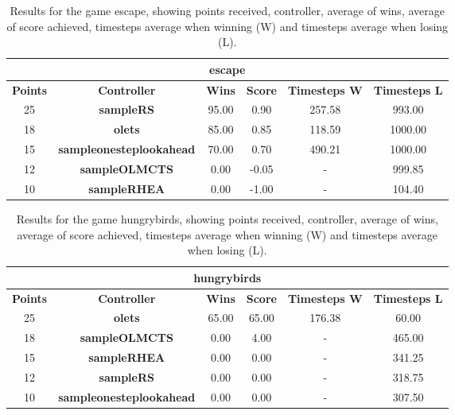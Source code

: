 \begin{table*}[!t]
\begin{center}
\begin{tabular}{|c|c|c|c|c|c|}
\multicolumn{6}{c}{\textbf{escape}}\\
\hline
\textbf{Points} & \textbf{Controller} & \textbf{Wins} &  \textbf{Score} & \textbf{Timesteps W} & \textbf{Timesteps L}\\
\hline
25 & \textbf{sampleRS} & 95.00 & 0.90 & 257.58 & 993.00
 \\
\hline
18 & \textbf{olets} & 85.00 & 0.85 & 118.59 & 1000.00
 \\
\hline
15 & \textbf{sampleonesteplookahead} & 70.00 & 0.70 & 490.21 & 1000.00
 \\
\hline
12 & \textbf{sampleOLMCTS} & 0.00 & -0.05 &  -  & 999.85
 \\
\hline
10 & \textbf{sampleRHEA} & 0.00 & -1.00 &  -  & 104.40
 \\
\hline
\end{tabular}
\caption{Results for the game escape, showing points received, controller, average of wins, average of score achieved, timesteps average when winning (W) and timesteps average when losing (L).}
\label{tab:weights}
\end{center}
\end{table*}
\begin{table*}[!t]
\begin{center}
\begin{tabular}{|c|c|c|c|c|c|}
\multicolumn{6}{c}{\textbf{hungrybirds}}\\
\hline
\textbf{Points} & \textbf{Controller} & \textbf{Wins} &  \textbf{Score} & \textbf{Timesteps W} & \textbf{Timesteps L}\\
\hline
25 & \textbf{olets} & 65.00 & 65.00 & 176.38 & 60.00
 \\
\hline
18 & \textbf{sampleOLMCTS} & 0.00 & 4.00 &  -  & 465.00
 \\
\hline
15 & \textbf{sampleRHEA} & 0.00 & 0.00 &  -  & 341.25
 \\
\hline
12 & \textbf{sampleRS} & 0.00 & 0.00 &  -  & 318.75
 \\
\hline
10 & \textbf{sampleonesteplookahead} & 0.00 & 0.00 &  -  & 307.50
 \\
\hline
\end{tabular}
\caption{Results for the game hungrybirds, showing points received, controller, average of wins, average of score achieved, timesteps average when winning (W) and timesteps average when losing (L).}
\label{tab:weights}
\end{center}
\end{table*}

